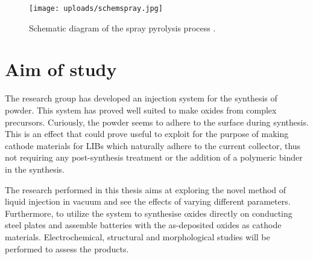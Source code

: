 \documentclass[Main/main.tex]{subfiles}
\begin{document}
\begin{figure}[ht]
    \centering
    \texttt{[image: uploads/schemspray.jpg]}
    \caption{Schematic diagram of the spray pyrolysis process \cite{elmat_sprayp}.}
    \label{fig:spray}
\end{figure}
\section{Aim of study}

The research group has developed an injection system for the synthesis of powder. This system has proved well suited to make oxides from complex precursors. Curiously, the powder seems to adhere to the surface during synthesis. This is an effect that could prove useful to exploit for the purpose of making cathode materials for LIBs which naturally adhere to the current collector, thus not requiring any post-synthesis treatment or the addition of a polymeric binder in the synthesis. 

The research performed in this thesis aims at exploring the novel method of liquid injection in vacuum and see the effects of varying different parameters. Furthermore, to utilize the system to synthesise oxides directly on conducting steel plates and assemble batteries with the as-deposited oxides as cathode materials. Electrochemical, structural and morphological studies will be performed to assess the products.
\end{document}
